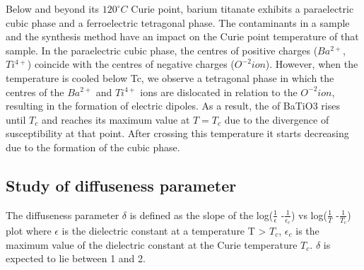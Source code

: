 		Below and beyond its $120^\circ C$ Curie point, barium titanate exhibits a paraelectric cubic phase and a ferroelectric tetragonal phase. The contaminants in a sample and the synthesis method have an impact on the Curie point temperature of that sample. In the paraelectric cubic phase, the centres of positive charges ($Ba^{2+}$, $Ti^{4+}$) coincide with the centres of negative charges ($O^{-2} ion$). However, when the temperature is cooled below Tc, we observe a tetragonal phase in which the centres of the $Ba^{2+}$ and $Ti^{4+}$ ions are dislocated in relation to the $O^{-2} ion$, resulting in the formation of electric dipoles. As a result, the of BaTiO3 rises until $T_c$ and reaches its maximum value at $T = T_c$ due to the divergence of susceptibility at that point.	After crossing this temperature it starts decreasing due to the formation of the cubic phase.

		\subsection{Study of diffuseness parameter}
  			The diffuseness parameter $\delta$ is defined as the slope of the log($\frac{1}{\epsilon}$ -$\frac{1}{\epsilon_c}$) vs log($\frac{1}{T}$ -$\frac{1}{T_c}$) plot where $\epsilon$ is the dielectric constant at a temperature T > $T_c$, ${\epsilon_c}$  is the maximum value of the dielectric constant at the Curie temperature $T_c$.  $\delta$ is expected to lie between 1 and 2.
